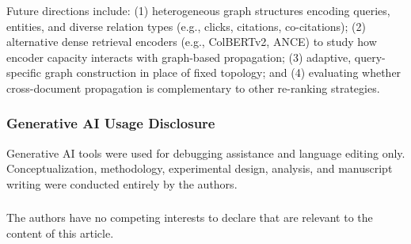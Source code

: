\documentclass[runningheads]{llncs}
\begin{document}
Future directions include: (1) heterogeneous graph structures encoding queries, entities, and diverse relation types (e.g., clicks, citations, co-citations); (2) alternative dense retrieval encoders (e.g., ColBERTv2, ANCE) to study how encoder capacity interacts with graph-based propagation; (3) adaptive, query-specific graph construction in place of fixed topology; and (4) evaluating whether cross-document propagation is complementary to other re-ranking strategies.
\begin{credits}
\subsubsection{Generative AI Usage Disclosure}
Generative AI tools were used for debugging assistance and language editing only. Conceptualization, methodology, experimental design, analysis, and manuscript writing were conducted entirely by the authors.

\subsubsection{\discintname}
The authors have no competing interests to declare that are relevant to the content of this article.
\end{credits}

%
%



\end{document}
